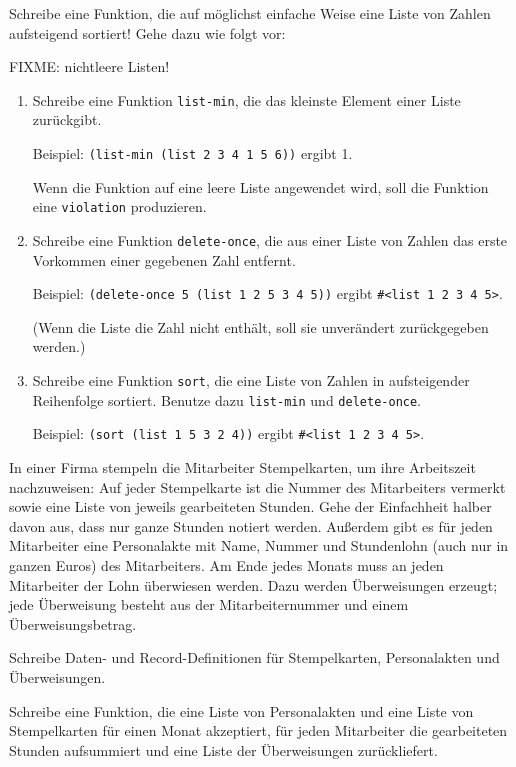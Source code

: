 \begin{aufgabe}
   Schreibe eine Funktion, die auf möglichst
  einfache Weise eine Liste von Zahlen aufsteigend sortiert! Gehe
  dazu wie folgt vor:

  FIXME: nichtleere Listen!
  
  \begin{enumerate}
  \item Schreibe eine Funktion
    \lstinline{list-min}, die das kleinste Element einer
    Liste zurückgibt.

    Beispiel: \lstinline{(list-min (list 2 3 4 1 5 6))} ergibt 1.

    Wenn die Funktion auf eine leere Liste angewendet
    wird, soll die Funktion eine \lstinline{violation} produzieren.
  \item Schreibe eine Funktion
    \lstinline{delete-once}, die aus einer Liste von Zahlen das erste
    Vorkommen einer gegebenen Zahl entfernt.

    Beispiel: \lstinline{(delete-once 5 (list 1 2 5 3 4 5))} ergibt
    \lstinline{#<list 1 2 3 4 5>}.
    
    (Wenn die Liste die Zahl nicht enthält,
    soll sie unverändert zurückgegeben werden.)
  \item  Schreibe eine Funktion \lstinline{sort}, die
    eine Liste von Zahlen in aufsteigender Reihenfolge sortiert.
    Benutze dazu \lstinline{list-min} und \lstinline{delete-once}.

    Beispiel: \lstinline{(sort (list 1 5 3 2 4))} ergibt
    \lstinline{#<list 1 2 3 4 5>}.

  \end{enumerate}
\end{aufgabe}

\begin{aufgabe}
   In einer Firma stempeln die Mitarbeiter Stempelkarten, um ihre
  Arbeitszeit nachzuweisen: Auf jeder Stempelkarte ist die Nummer des
  Mitarbeiters vermerkt sowie eine Liste von jeweils gearbeiteten
  Stunden. Gehe der Einfachheit halber davon aus, dass nur ganze Stunden
  notiert werden.
  Außerdem gibt es für jeden Mitarbeiter eine Personalakte
  mit Name, Nummer und Stundenlohn (auch nur in ganzen Euros) des Mitarbeiters.
  Am Ende jedes Monats 
  muss an jeden Mitarbeiter der Lohn überwiesen werden.  Dazu werden
  Überweisungen erzeugt; jede Überweisung besteht aus der
  Mitarbeiternummer und einem Überweisungsbetrag.

  Schreibe Daten- und Record-Definitionen für Stempelkarten,
  Personalakten und Überweisungen.

  Schreibe eine Funktion, die eine Liste von Personalakten
  und eine Liste von Stempelkarten für einen Monat akzeptiert, für jeden
  Mitarbeiter die gearbeiteten Stunden aufsummiert und eine
  Liste der Überweisungen zurückliefert.
\end{aufgabe}

